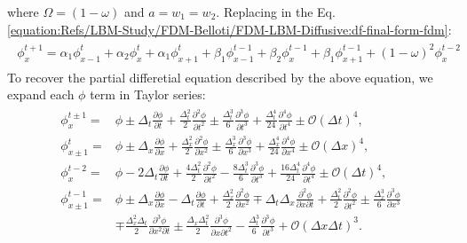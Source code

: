 \documentclass[letterpaper,10pt,english,openany,oneside]{jupyterBook}
\begin{document}
\sphinxAtStartPar
where \(\Omega=(1-\omega)\) and \(a=w_{1}=w_{2}\). Replacing in the Eq. \eqref{equation:Refs/LBM-Study/FDM-Belloti/FDM-LBM-Diffusive:df-final-form-fdm}:
\begin{equation*}
\begin{split}
\begin{array}{c}
\phi_{x}^{t+1} = \alpha_{1} \phi_{x-1}^{t} + \alpha_{2} \phi_{x}^{t} + \alpha_{1} \phi_{x+1}^{t} + \beta_{1}\phi_{x-1}^{t-1} + \beta_{2}\phi_{x}^{t-1} + \beta_{1}\phi_{x+1}^{t-1}  + (1-\omega)^{2} \phi_{x}^{t-2}
\end{array}
\end{split}
\end{equation*}
\sphinxAtStartPar
To recover the partial differetial equation described by the above equation, we expand each \(\phi\) term in Taylor series:
\begin{equation}\label{equation:Refs/LBM-Study/FDM-Belloti/FDM-LBM-Diffusive:FDM-LBM-diff-expansions-phi}
\begin{split}
\begin{array}{ll}
\phi_{x}^{t\pm 1} =& \phi \pm \Delta_{t}\displaystyle\frac{\partial\phi}{\partial t} + \frac{\Delta_{t}^{2}}{2}\frac{\partial^{2}\phi}{\partial t^{2}} \pm \frac{\Delta_{t}^{3}}{6}\frac{\partial^{3}\phi}{\partial t^{3}} + \frac{\Delta_{t}^{4}}{24}\frac{\partial^{4}\phi}{\partial t^{4}} \pm  \mathcal{O}(\Delta t)^{4},\\
\phi_{x\pm 1}^{t} =& \phi \pm \Delta_{x}\displaystyle\frac{\partial\phi}{\partial x} + \frac{\Delta_{x}^{2}}{2}\frac{\partial^{2}\phi}{\partial x^{2}} \pm \frac{\Delta_{x}^{3}}{6}\frac{\partial^{3}\phi}{\partial x^{3}} + \frac{\Delta_{x}^{4}}{24}\frac{\partial^{4}\phi}{\partial x^{4}} \pm \mathcal{O}(\Delta x)^{4},\\
\phi_{x}^{t - 2} =& \phi - 2\Delta_{t}\displaystyle\frac{\partial\phi}{\partial t} + \frac{4\Delta_{t}^{2}}{2}\frac{\partial^{2}\phi}{\partial t^{2}} - \frac{8\Delta_{t}^{3}}{6}\frac{\partial^{3}\phi}{\partial t^{3}} + \frac{16\Delta_{t}^{4}}{24}\frac{\partial^{4}\phi}{\partial t^{4}} \pm  \mathcal{O}(\Delta t)^{4},\\
\phi_{x\pm 1}^{t-1} =& \phi \pm \Delta_{x} \displaystyle\frac{\partial\phi}{\partial x} - \Delta_{t}\frac{\partial\phi}{\partial t} + \frac{\Delta_{x}^{2}}{2}\frac{\partial^{2}\phi}{\partial x^{2}} \mp \Delta_{t}\Delta_{x} \frac{\partial^{2}\phi}{\partial x\partial t} + \frac{\Delta_{t}^{2}}{2}\frac{\partial^{2}\phi}{\partial t^{2}} \pm \frac{\Delta_{x}^{3}}{6}\frac{\partial^{3}\phi}{\partial x^{3}} \\
& \mp \displaystyle\frac{\Delta_{x}^{2}\Delta_{t}}{2}\frac{\partial^{3}\phi}{\partial x^{2}\partial t}  \pm \frac{\Delta_{x}\Delta_{t}^{2}}{2}\frac{\partial^{3}\phi}{\partial x\partial t^{2}} - \frac{\Delta_{t}^{3}}{6}\frac{\partial^{3}\phi}{\partial t^{3}} + \mathcal{O}(\Delta x \Delta t)^{3}.
\end{array}
\end{split}
\end{equation}
\end{document}
